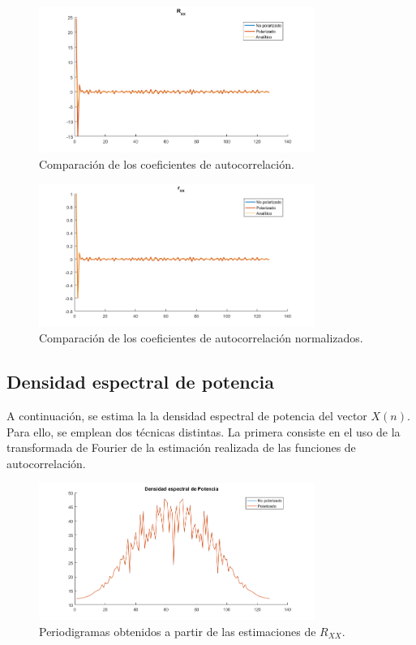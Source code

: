 \begin{figure}[H]
\centering
	\includegraphics[width=0.8\textwidth, trim = {0 0 0 0.7cm},clip]{./ImagenesEjercicio2/Rxxcalc.png}
	\caption{Comparación de los coeficientes de autocorrelación.}
	\label{fig:Rxxcalc}
\end{figure}
\begin{figure}[H]
\centering
	\includegraphics[width=0.8\textwidth, trim = {0 0 0 0.7cm},clip]{./ImagenesEjercicio2/rrxxcalc.png}
	\caption{Comparación de los coeficientes de autocorrelación normalizados.}
	\label{fig:rrxxcalc2}
\end{figure}

\subsection{Densidad espectral de potencia}

A continuación, se estima la la densidad espectral de potencia del vector $X(n)$. Para ello, se emplean dos técnicas distintas. La primera consiste en el uso de la transformada de Fourier de la estimación realizada de las funciones de autocorrelación.
\begin{figure}[H]
\centering
	\includegraphics[width=0.8\textwidth, trim = {0 0 0 0.735cm},clip]{./ImagenesEjercicio2/period-est.png}
	\caption{Periodigramas obtenidos a partir de las estimaciones de $R_{XX}$.}
	\label{fig:period-est}
\end{figure}

